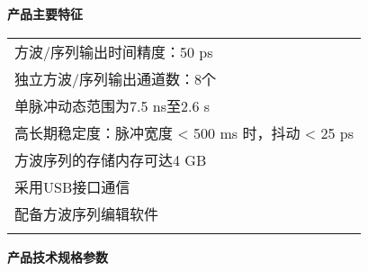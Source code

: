 \makeatletter
\def\hlinewd#1{%
  \noalign{\ifnum0=`}\fi\hrule \@height #1 \futurelet
   \reserved@a\@xhline}
\makeatother
\noindent\sanhao\textbf{产品主要特征}
\vspace{0.2cm}
\song
\begin{table}[H]
\normalsize
{}
\begin{tabular}{m{13.5cm}}
\rowcolor{gray!20}
\arrayrulecolor{tabcolor_top}\toprule[1.8pt]
方波/序列输出时间精度：50 ps\\\arrayrulecolor{tabcolor}\midrule[1.2pt]
独立方波/序列输出通道数：8个 \\\arrayrulecolor{tabcolor}\midrule[1.2pt]
单脉冲动态范围为7.5 ns至2.6 s\\\arrayrulecolor{tabcolor}\midrule[1.2pt]
高长期稳定度：脉冲宽度 < 500 ms 时，抖动 < 25 ps \\\arrayrulecolor{tabcolor}\midrule[1.2pt]
方波序列的存储内存可达4 GB\\\arrayrulecolor{tabcolor}\midrule[1.2pt]
采用USB接口通信\\\arrayrulecolor{tabcolor}\midrule[1.2pt]
配备方波序列编辑软件\\
\arrayrulecolor{tabcolor_top}\bottomrule[1.8pt]
\end{tabular}
\end{table}


\noindent\sanhao\textbf{产品技术规格参数}
\vspace{0.5cm}

